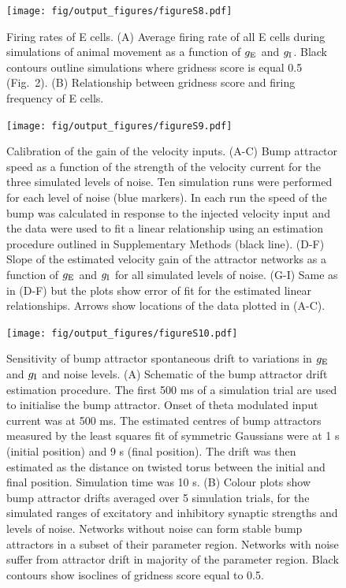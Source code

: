\documentclass[a4paper,12pt]{article}
\newcommand{\ssc}[3]{\ensuremath{#1_{\text{#2}_{\text{#3}}}}}
\newcommand{\gE      }{\ssc{g}      {\scriptsize{E}}{}}
\newcommand{\gI      }{\ssc{g}      {\scriptsize{I}}{}}
\begin{document}
\clearpage

\begin{figure}[ht!]
    \internallinenumbers
    \centering
        \texttt{[image: fig/output\_figures/figureS8.pdf]}
    \caption{Firing rates of E cells. (A) Average firing rate of all E cells
    during simulations of animal movement as a function of $\gE$ and $\gI$.
    Black contours outline simulations where gridness score is equal 0.5
    (Fig.~2). (B) Relationship between gridness score and firing frequency of
    E cells.}
\end{figure}

\clearpage

\begin{figure}[ht!]
    \internallinenumbers
    \centering
        \texttt{[image: fig/output\_figures/figureS9.pdf]}
    \caption{Calibration of the gain of the velocity inputs. (A-C) Bump
    attractor speed as a function of the strength of the velocity current for
    the three simulated levels of noise. Ten simulation runs were performed for
    each level of noise (blue markers). In each run the speed of the bump was
    calculated in response to the injected velocity input and the data were
    used to fit a linear relationship using an estimation procedure outlined
    in Supplementary Methods (black line). (D-F) Slope of the estimated velocity gain of
    the attractor networks as a function of $\gE$ and $\gI$ for all simulated
    levels of noise. (G-I) Same as in (D-F) but the plots show error of fit
    for the estimated linear relationships. Arrows show locations of the data
    plotted in (A-C).}
\end{figure}

\clearpage

\begin{figure}[ht!]
    \internallinenumbers
    \centering
        \texttt{[image: fig/output\_figures/figureS10.pdf]}
    \caption{Sensitivity of bump attractor spontaneous drift to
    variations in $\gE$ and $\gI$ and noise levels. (A) Schematic
    of the bump attractor drift estimation procedure. The first 500 ms of a
    simulation trial are used to initialise the bump attractor. Onset of theta
    modulated input current was at 500 ms. The estimated centres of bump
    attractors measured by the least squares fit of symmetric Gaussians were at
    1 s (initial position) and 9 s (final position). The drift was then
    estimated as the distance on twisted torus between the initial and final
    position. Simulation time was 10 s. (B) Colour plots show bump
    attractor drifts averaged over 5 simulation trials, for the simulated
    ranges of excitatory and inhibitory synaptic strengths and levels of noise.
    Networks without noise can form stable bump attractors in a subset of
    their parameter region. Networks with noise suffer from attractor drift in
    majority of the parameter region. Black contours show isoclines of gridness
    score equal to 0.5.}
\end{figure}
\end{document}

